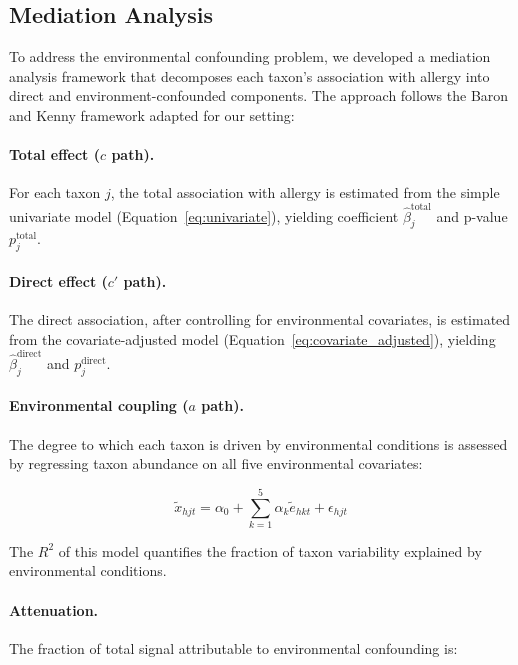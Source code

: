 \documentclass[11pt,letterpaper]{article}
\begin{document}
\subsection{Mediation Analysis}

To address the environmental confounding problem, we developed a mediation analysis framework that decomposes each taxon's association with allergy into direct and environment-confounded components. The approach follows the Baron and Kenny framework \citep{baron1986moderator} adapted for our setting:

\paragraph{Total effect ($c$ path).} For each taxon $j$, the total association with allergy is estimated from the simple univariate model (Equation~\ref{eq:univariate}), yielding coefficient $\hat{\beta}_j^{\text{total}}$ and p-value $p_j^{\text{total}}$.

\paragraph{Direct effect ($c'$ path).} The direct association, after controlling for environmental covariates, is estimated from the covariate-adjusted model (Equation~\ref{eq:covariate_adjusted}), yielding $\hat{\beta}_j^{\text{direct}}$ and $p_j^{\text{direct}}$.

\paragraph{Environmental coupling ($a$ path).} The degree to which each taxon is driven by environmental conditions is assessed by regressing taxon abundance on all five environmental covariates:

\begin{equation}
    \tilde{x}_{hjt} = \alpha_0 + \sum_{k=1}^{5} \alpha_k \tilde{e}_{hkt} + \epsilon_{hjt}
\end{equation}

\noindent The $R^2$ of this model quantifies the fraction of taxon variability explained by environmental conditions.

\paragraph{Attenuation.} The fraction of total signal attributable to environmental confounding is:
\end{document}
